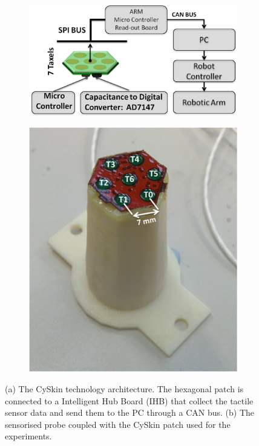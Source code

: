 \begin{figure}[] 
	\centering
	\begin{subfigure}[b]{.685\columnwidth}
		\includegraphics[width=\columnwidth]{./figs/Presentationarchitecture.eps}
		\caption{}
		\label{CySkin:schema}
	\end{subfigure} 
	\hspace{0.02\columnwidth}
	\begin{subfigure}[b]{0.27\columnwidth}
		\includegraphics[width=\columnwidth]{./figs/probefreccia.eps}
		\caption{}
		\label{CySkin:probe}
	\end{subfigure}
	\caption{(a) The CySkin technology architecture. The hexagonal patch is connected to a 
		Intelligent Hub Board (IHB) that collect the tactile sensor data and send them to the 
		PC through a CAN bus. (b) The sensorised probe coupled with the CySkin patch used for 
		the experiments. }
	\label{CySkin}
\end{figure}
